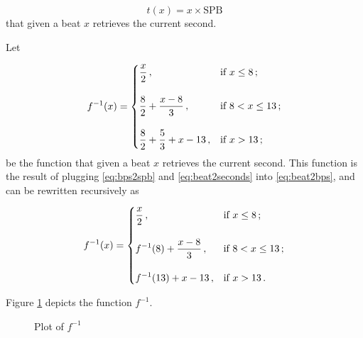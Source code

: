 \documentclass[a4paper,9pt]{article}
\begin{document}
\begin{equation}
	t(x) = x\times \text{SPB}
	\label{eq:beat2seconds}
\end{equation}
that given a beat $x$ retrieves the current second.

Let 



    \begin{equation}
	    f^{-1}(x) = \begin{dcases}
		    \frac{x}{2}\,, & \text{if $x \leq 8\,;$}\\[1em]
		    \frac{8}{2}+\frac{x-8}{3}\,, & \text{if $8 < x \leq 13\,;$}\\[1em]  
		    \frac{8}{2}+\frac{5}{3}+x- 13\,, & \text{if $x > 13\,;$}\\ 
	    \end{dcases}
	    \label{eq:beat2second}
    \end{equation}
    be the function that given a beat $x$ retrieves the current second. This function is the result of plugging \eqref{eq:bps2spb} and \eqref{eq:beat2seconds} into \eqref{eq:beat2bps}, and can be rewritten recursively as

    \begin{equation}
	    f^{-1}(x) = \begin{dcases}
		    \frac{x}{2}\,, & \text{if $x \leq 8\,;$}\\[1em]
		    f^{-1}(8)+\frac{x-8}{3}\,, & \text{if $8 < x \leq 13\,;$}\\[1em]  
		    f^{-1}(13) + x- 13\,, & \text{if $x > 13\,.$}\\ 
	    \end{dcases}
	    \label{eq:beat2second}
    \end{equation}

    Figure \ref{fig:beat2second} depicts the function $f^{-1}$. 
    
\begin{figure}[htpb]
	\centering

\caption{Plot of $f^{-1}$}
	\label{fig:beat2second}
\end{figure}
\end{document}
